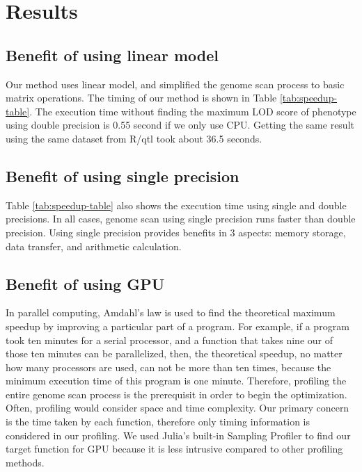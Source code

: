 \documentclass[9pt,twocolumn,twoside,lineno]{gsag3jnl}
\begin{document}
 
\section{Results}
\subsection{Benefit of using linear model}
Our method uses linear model, and simplified the genome scan process to basic matrix operations. 
The timing of our method is shown in Table \ref{tab:speedup-table}. 
The execution time without finding the maximum LOD score of phenotype using double precision is 0.55 second if we only use CPU. 
Getting the same result using the same dataset from R/qtl took about 36.5 seconds. 

\subsection{Benefit of using single precision}
Table \ref{tab:speedup-table} also shows the execution time using single and double precisions. 
In all cases, genome scan using single precision runs faster than double precision. 
Using single precision provides benefits in 3 aspects: memory storage, data transfer, and arithmetic calculation. 

\subsection{Benefit of using GPU}
In parallel computing, Amdahl's law is used to find the theoretical maximum speedup by improving a particular part of a program.  
For example, if a program took ten minutes for a serial processor, and a function that takes nine our of those ten minutes can be parallelized, then, the theoretical speedup, no matter how many processors are used, can not be more than ten times, because the minimum execution time of this program is one minute. 
Therefore, profiling the entire genome scan process is the prerequisit in order to begin the optimization. 
Often, profiling would consider space and time complexity. 
Our primary concern is the time taken by each function, therefore only timing information is considered in our profiling. 
We used Julia's built-in Sampling Profiler %
to find our target function for GPU because it is less intrusive compared to other profiling methods. 
\end{document}
